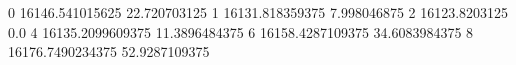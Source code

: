 0 16146.541015625 22.720703125
1 16131.818359375 7.998046875
2 16123.8203125 0.0
4 16135.2099609375 11.3896484375
6 16158.4287109375 34.6083984375
8 16176.7490234375 52.9287109375
